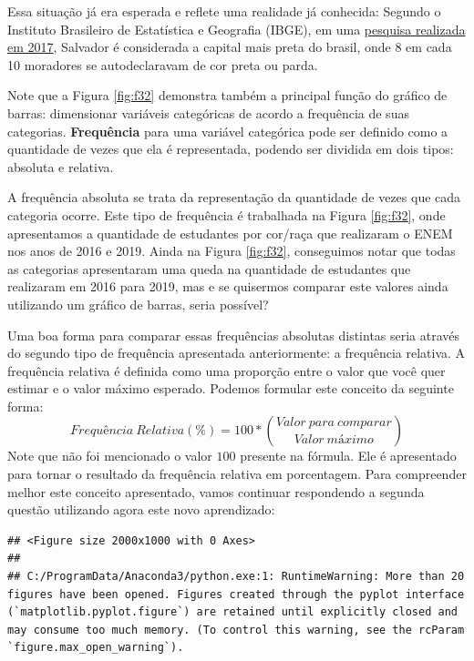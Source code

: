 \documentclass[
  oneside]{book}
\begin{document}
Essa situação já era esperada e reflete uma realidade já conhecida: Segundo o Instituto Brasileiro de Estatística e Geografia (IBGE), em uma \href{https://www.acordacidade.com.br/noticias/203087/ibge-ba-salvador-a-capital-mais-negra-do-brasil-e-com-a-maior-desigualdade-salarial-entre-brancos-e-pretos.html?mobile=true}{pesquisa realizada em 2017}, Salvador é considerada a capital mais preta do brasil, onde 8 em cada 10 moradores se autodeclaravam de cor preta ou parda.

Note que a Figura \ref{fig:f32} demonstra também a principal função do gráfico de barras: dimensionar variáveis categóricas de acordo a frequência de suas categorias. \textbf{Frequência} para uma variável categórica pode ser definido como a quantidade de vezes que ela é representada, podendo ser dividida em dois tipos: absoluta e relativa.

A frequência absoluta se trata da representação da quantidade de vezes que cada categoria ocorre. Este tipo de frequência é trabalhada na Figura \ref{fig:f32}, onde apresentamos a quantidade de estudantes por cor/raça que realizaram o ENEM nos anos de 2016 e 2019. Ainda na Figura \ref{fig:f32}, conseguimos notar que todas as categorias apresentaram uma queda na quantidade de estudantes que realizaram em 2016 para 2019, mas e se quisermos comparar este valores ainda utilizando um gráfico de barras, seria possível?

Uma boa forma para comparar essas frequências absolutas distintas seria através do segundo tipo de frequência apresentada anteriormente: a frequência relativa. A frequência relativa é definida como uma proporção entre o valor que você quer estimar e o valor máximo esperado. Podemos formular este conceito da seguinte forma:
\[Frequência\ Relativa (\%) = 100*{Valor\ para\ comparar \choose Valor\ máximo}\]
Note que não foi mencionado o valor \(100\) presente na fórmula. Ele é apresentado para tornar o resultado da frequência relativa em porcentagem. Para compreender melhor este conceito apresentado, vamos continuar respondendo a segunda questão utilizando agora este novo aprendizado:

\begin{verbatim}
## <Figure size 2000x1000 with 0 Axes>
## 
## C:/ProgramData/Anaconda3/python.exe:1: RuntimeWarning: More than 20 figures have been opened. Figures created through the pyplot interface (`matplotlib.pyplot.figure`) are retained until explicitly closed and may consume too much memory. (To control this warning, see the rcParam `figure.max_open_warning`).
\end{verbatim}
\end{document}
